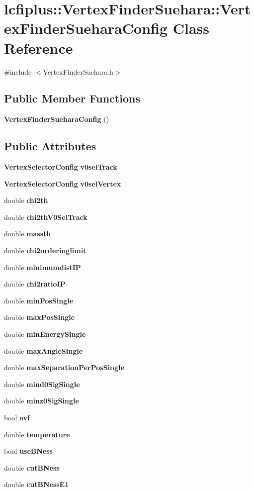 \section{lcfiplus\-:\-:Vertex\-Finder\-Suehara\-:\-:Vertex\-Finder\-Suehara\-Config Class Reference}
\label{classlcfiplus_1_1VertexFinderSuehara_1_1VertexFinderSueharaConfig}


{\ttfamily \#include $<$Vertex\-Finder\-Suehara.\-h$>$}

\subsection*{Public Member Functions}
\begin{DoxyCompactItemize}
\item 
{\bf Vertex\-Finder\-Suehara\-Config} ()
\end{DoxyCompactItemize}
\subsection*{Public Attributes}
\begin{DoxyCompactItemize}
\item 
{\bf Vertex\-Selector\-Config} {\bf v0sel\-Track}
\item 
{\bf Vertex\-Selector\-Config} {\bf v0sel\-Vertex}
\item 
double {\bf chi2th}
\item 
double {\bf chi2th\-V0\-Sel\-Track}
\item 
double {\bf massth}
\item 
double {\bf chi2orderinglimit}
\item 
double {\bf minimumdist\-I\-P}
\item 
double {\bf chi2ratio\-I\-P}
\item 
double {\bf min\-Pos\-Single}
\item 
double {\bf max\-Pos\-Single}
\item 
double {\bf min\-Energy\-Single}
\item 
double {\bf max\-Angle\-Single}
\item 
double {\bf max\-Separation\-Per\-Pos\-Single}
\item 
double {\bf mind0\-Sig\-Single}
\item 
double {\bf minz0\-Sig\-Single}
\item 
bool {\bf avf}
\item 
double {\bf temperature}
\item 
bool {\bf use\-B\-Ness}
\item 
double {\bf cut\-B\-Ness}
\item 
double {\bf cut\-B\-Ness\-E1}
\end{DoxyCompactItemize}


